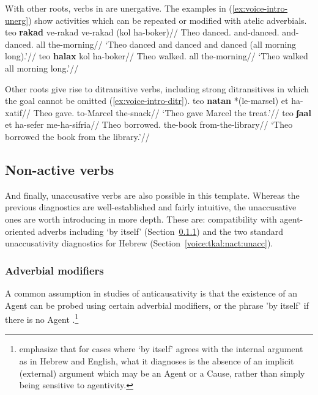 With other roots, verbs in {\tkal} are unergative. The examples in (\ref{ex:voice-intro-unerg}) show activities which can be repeated or modified with atelic adverbials.
\pex\label{ex:voice-intro-unerg}
	\a \begingl
		\gla teo \textbf{rakad} ve-rakad ve-rakad (kol ha-boker)//
		\glb Theo danced. and-danced. and-danced. all the-morning//
		\glft `Theo danced and danced and danced (all morning long).'//
	\endgl
	\a \begingl
		\gla teo \textbf{halax} kol ha-boker//
		\glb Theo walked. all the-morning//
		\glft `Theo walked all morning long.'//
	\endgl
\xe

Other roots give rise to ditransitive verbs, including strong ditransitives in which the goal cannot be omitted (\ref{ex:voice-intro-ditr}).
\pex\label{ex:voice-intro-ditr}
	\a \begingl
		\gla teo \textbf{natan} *(le-marsel) et ha-xatif//
		\glb Theo gave. to-Marcel   the-snack//
		\glft `Theo gave Marcel the treat.'//
	\endgl
	\a \begingl
		\gla teo \textbf{ʃaal} et ha-sefer me-ha-sifria//
		\glb Theo borrowed.  the-book from-the-library//
		\glft `Theo borrowed the book from the library.'//
	\endgl
\xe

	\subsection{Non-active verbs} \label{voice:tkal:nact}
And finally, unaccusative verbs are also possible in this template. Whereas the previous diagnostics are well-established and fairly intuitive, the unaccusative ones are worth introducing in more depth. These are: compatibility with agent-oriented adverbs including `by itself’ (Section~\ref{voice:tkal:nact:adv}) and the two standard unaccusativity diagnostics for Hebrew (Section~\ref{voice:tkal:nact:unacc}).

		\subsubsection{Adverbial modifiers} \label{voice:tkal:nact:adv}
A common assumption in studies of anticausativity is that the existence of an Agent can be probed using certain adverbial modifiers, or the phrase 'by itself' if there is no Agent \citep{unaccusativity95,alexiadouanagnostopoulou04,layering15,alexiadoudoron12,koontzgarboden09,kastner17gjgl}.\footnote{\cite{layering15} emphasize that for cases where `by itself' agrees with the internal argument as in Hebrew and English, what it diagnoses is the absence of an implicit (external) argument which may be an Agent or a Cause, rather than simply being sensitive to agentivity.} 

